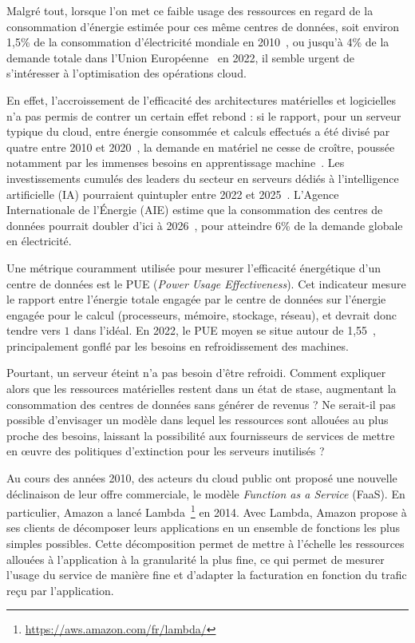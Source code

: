 Malgré tout, lorsque l'on met ce faible usage des ressources en regard de la consommation d'énergie estimée pour ces même centres de données, soit environ 1,5\% de la consommation d'électricité mondiale en 2010~\cite{masanetRecalibratingGlobalData2020}, ou jusqu'à 4\% de la demande totale dans l'Union Européenne~\cite{Electricity2024Analysis2024} en 2022, il semble urgent de s'intéresser à l'optimisation des opérations cloud.

En effet, l'accroissement de l'efficacité des architectures matérielles et logicielles n'a pas permis de contrer un certain effet rebond : si le rapport, pour un serveur typique du cloud, entre énergie consommée et calculs effectués a été divisé par quatre entre 2010 et 2020~\cite{masanetRecalibratingGlobalData2020}, la demande en matériel ne cesse de croître, poussée notamment par les immenses besoins en apprentissage machine~\cite{commentMetaOperate6002024}. Les investissements cumulés des leaders du secteur en serveurs dédiés à l'intelligence artificielle (IA) pourraient quintupler entre 2022 et 2025~\cite{DerriereIADeferlante2024, elderNextWaveAI2024}. L'Agence Internationale de l'Énergie (AIE) estime que la consommation des centres de données pourrait doubler d'ici à 2026~\cite{Electricity2024Analysis2024}, pour atteindre 6\% de la demande globale en électricité.

Une métrique couramment utilisée pour mesurer l'efficacité énergétique d'un centre de données est le PUE (\textit{Power Usage Effectiveness}). Cet indicateur mesure le rapport entre l'énergie totale engagée par le centre de données sur l'énergie engagée pour le calcul (processeurs, mémoire, stockage, réseau), et devrait donc tendre vers $1$ dans l'idéal. En 2022, le PUE moyen se situe autour de 1,55~\cite{davisUptimeInstituteGlobal2022}, principalement gonflé par les besoins en refroidissement des machines.

Pourtant, un serveur éteint n'a pas besoin d'être refroidi. Comment expliquer alors que les ressources matérielles restent dans un état de stase, augmentant la consommation des centres de données sans générer de revenus ? Ne serait-il pas possible d'envisager un modèle dans lequel les ressources sont allouées au plus proche des besoins, laissant la possibilité aux fournisseurs de services de mettre en œuvre des politiques d'extinction pour les serveurs inutilisés ?

Au cours des années 2010, des acteurs du cloud public ont proposé une nouvelle déclinaison de leur offre commerciale, le modèle \textit{Function as a Service} (FaaS). En particulier, Amazon a lancé Lambda~\footnote{\href{https://aws.amazon.com/fr/lambda/}{https://aws.amazon.com/fr/lambda/}} en 2014. Avec Lambda, Amazon propose à ses clients de décomposer leurs applications en un ensemble de fonctions les plus simples possibles. Cette décomposition permet de mettre à l'échelle les ressources allouées à l'application à la granularité la plus fine, ce qui permet de mesurer l'usage du service de manière fine et d'adapter la facturation en fonction du trafic reçu par l'application.

